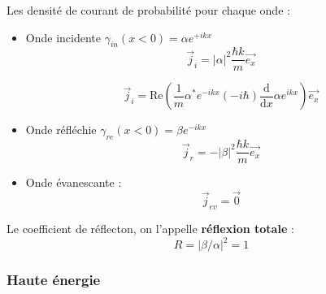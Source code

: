 Les densité de courant de probabilité pour chaque onde : 
\begin{itemize}

    \item Onde incidente $\gamma _{in} (x < 0) = \alpha e ^{+ikx}$
      \begin{equation}
        \overrightarrow{j} _{i} = | \alpha | ^{2} \frac{\hbar k}{m}  \overrightarrow{e_x}
      \end{equation}

      \begin{myproof}{}{}
      \begin{equation}
        \overrightarrow{j}_i = \mathrm{Re} \left( \frac{1}{m}  \alpha ^{*}e ^{-ikx} (-i \hbar) \frac{\mathrm{d}}{\mathrm{d}x} \alpha e ^{ikx} \right) \overrightarrow{e_x}
      \end{equation}
      \end{myproof}

    \item Onde réfléchie $\gamma _{re} (x < 0) = \beta e ^{-i kx}$ 
      \begin{equation}
        \overrightarrow{j}_{r} = - | \beta | ^{2} \frac{\hbar k}{m}  \overrightarrow{e_x}
      \end{equation}

    \item Onde évanescante :  
      \begin{equation}
        \overrightarrow{j} _{ev} = \overrightarrow{0}
      \end{equation}

      

\end{itemize}

Le coefficient de réflecton, on l'appelle \textbf{réflexion totale} : 
\begin{equation}
  R = | \beta / \alpha | ^{2} = 1
\end{equation}

\subsubsection{Haute énergie} %

